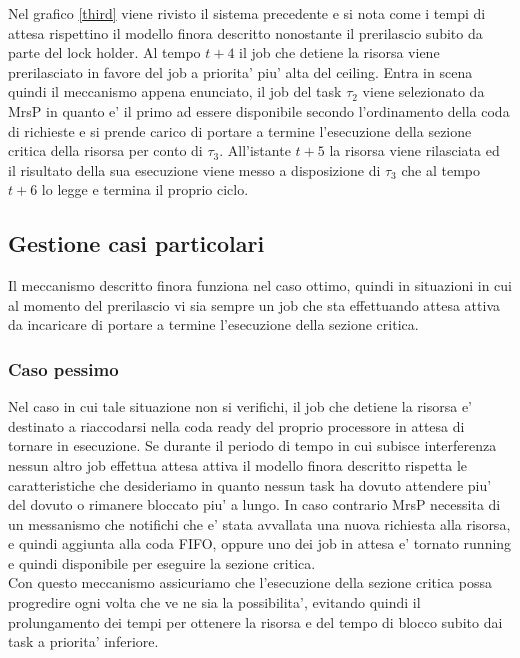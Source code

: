 \documentclass[a4paper,11pt]{article}
\begin{document}
\noindent Nel grafico \ref{third} viene rivisto il sistema precedente e si nota come i tempi di attesa rispettino il modello finora descritto nonostante il prerilascio subito da parte del lock holder. Al tempo $t + 4$ il job che detiene la risorsa viene prerilasciato in favore del job a priorita' piu' alta del ceiling. Entra in scena quindi il meccanismo appena enunciato, il job del task $\tau_2$ viene selezionato da MrsP in quanto e' il primo ad essere disponibile secondo l'ordinamento della coda di richieste e si prende carico di portare a termine l'esecuzione della sezione critica della risorsa per conto di $\tau_3$. All'istante $t + 5$ la risorsa viene rilasciata ed il risultato della sua esecuzione viene messo a disposizione di $\tau_3$ che al tempo $t + 6$ lo legge e termina il proprio ciclo.\\

\subsection{Gestione casi particolari}

\noindent Il meccanismo descritto finora funziona nel caso ottimo, quindi in situazioni in cui al momento del prerilascio vi sia sempre un job che sta effettuando attesa attiva da incaricare di portare a termine l'esecuzione della sezione critica.

\subsubsection{Caso pessimo}

\noindent Nel caso in cui tale situazione non si verifichi, il job che detiene la risorsa e' destinato a riaccodarsi nella coda ready del proprio processore in attesa di tornare in esecuzione. Se durante il periodo di tempo in cui subisce interferenza nessun altro job effettua attesa attiva il modello finora descritto rispetta le caratteristiche che desideriamo in quanto nessun task ha dovuto attendere piu' del dovuto o rimanere bloccato piu' a lungo. In caso contrario MrsP necessita di un messanismo che notifichi che e' stata avvallata una nuova richiesta alla risorsa, e quindi aggiunta alla coda FIFO, oppure uno dei job in attesa e' tornato running e quindi disponibile per eseguire la sezione critica.\\

\noindent Con questo meccanismo assicuriamo che l'esecuzione della sezione critica possa progredire ogni volta che ve ne sia la possibilita', evitando quindi il prolungamento dei tempi per ottenere la risorsa e del tempo di blocco subito dai task a priorita' inferiore.\\
\end{document}
